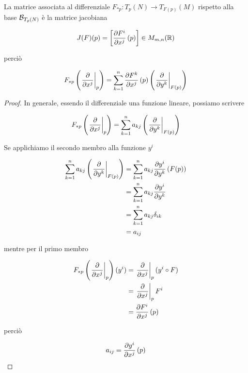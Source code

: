 La matrice associata al differenziale $ F_{*p} : T_{p}(N) \to T_{F(p)}(M) $ rispetto alla base $ \mathcal{B}_{T_{p}(N)} $ è la matrice jacobiana

\begin{equation}
	J(F)(p) = \left[ \pdv{F^{i}}{x^{j}} \, (p) \right] \in M_{m,n}(\mathbb{R})
\end{equation}

perciò

\begin{equation}
	F_{*p} \left( \eval{ \pdv{x^{j}} }_{p} \right) = \sum_{k=1}^{n} \pdv{F^{k}}{x^{j}} \, (p) \left( \eval{ \pdv{y^{k}} }_{F(p)} \right)
\end{equation}

\begin{proof}
	In generale, essendo il differenziale una funzione lineare, possiamo scrivere
	
	\begin{equation}
		F_{*p} \left( \eval{ \pdv{x^{j}} }_{p} \right) = \sum_{k=1}^{n} a_{kj} \left( \eval{ \pdv{y^{k}} }_{F(p)} \right)
	\end{equation}
	
	Se applichiamo il secondo membro alla funzione $ y^{i} $
	
	\begin{align}
		\begin{split}
			\sum_{k=1}^{n} a_{kj} \left( \eval{ \pdv{y^{k}} }_{F(p)} \right) &= \sum_{k=1}^{n} a_{kj} \pdv{y^{i}}{y^{k}} \, (F(p)) \\
			&= \sum_{k=1}^{n} a_{kj} \pdv{y^{i}}{y^{k}} \\
			&= \sum_{k=1}^{n} a_{kj} \delta_{ik} \\
			&= a_{ij}
		\end{split}
	\end{align}
	
	mentre per il primo membro
	
	\begin{align}
		\begin{split}
			F_{*p} \left( \eval{ \pdv{x^{j}} }_{p} \right) (y^{i}) &= \eval{ \pdv{x^{j}} }_{p} (y^{i} \circ F) \\
			&= \eval{ \pdv{x^{j}} }_{p} F^{i} \\
			&= \pdv{F^{i}}{x^{j}} \, (p)
		\end{split}
	\end{align}

	perciò
	
	\begin{equation}
	a_{ij} = \pdv{y^{i}}{x^{j}} \, (p)
	\end{equation}
\end{proof}

